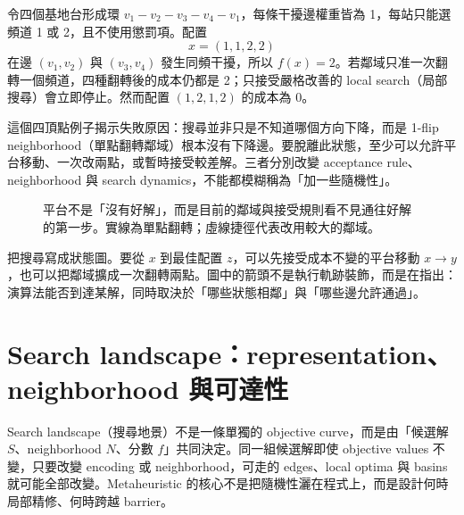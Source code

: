 \documentclass[11pt,a4paper,oneside,openany]{book}
\begin{document}
\begin{example}[最小但不平凡的頻道配置]
令四個基地台形成環 $v_1-v_2-v_3-v_4-v_1$，每條干擾邊權重皆為 1，每站只能選頻道 1 或 2，且不使用懲罰項。配置
\[
 x=(1,1,2,2)
\]
在邊 $(v_1,v_2)$ 與 $(v_3,v_4)$ 發生同頻干擾，所以 $f(x)=2$。若鄰域只准一次翻轉一個頻道，四種翻轉後的成本仍都是 2；只接受嚴格改善的 local search（局部搜尋）會立即停止。然而配置 $(1,2,1,2)$ 的成本為 0。

這個四頂點例子揭示失敗原因：搜尋並非只是不知道哪個方向下降，而是 1-flip neighborhood（單點翻轉鄰域）根本沒有下降邊。要脫離此狀態，至少可以允許平台移動、一次改兩點，或暫時接受較差解。三者分別改變 acceptance rule、neighborhood 與 search dynamics，不能都模糊稱為「加一些隨機性」。
\end{example}

\begin{figure}[htbp]
\centering
{}
\caption{平台不是「沒有好解」，而是目前的鄰域與接受規則看不見通往好解的第一步。實線為單點翻轉；虛線捷徑代表改用較大的鄰域。}
\label{fig:plateau-state}
\end{figure}

 把搜尋寫成狀態圖。要從 $x$ 到最佳配置 $z$，可以先接受成本不變的平台移動 $x\to y$，也可以把鄰域擴成一次翻轉兩點。圖中的箭頭不是執行軌跡裝飾，而是在指出：演算法能否到達某解，同時取決於「哪些狀態相鄰」與「哪些邊允許通過」。

\section[Search landscape：representation 與 neighborhood 如何改變可達性]
  {Search landscape：representation、neighborhood 與可達性}
\begin{coreintuition}
Search landscape（搜尋地景）不是一條單獨的 objective curve，而是由「候選解 $S$、neighborhood $N$、分數 $f$」共同決定。同一組候選解即使 objective values 不變，只要改變 encoding 或 neighborhood，可走的 edges、local optima 與 basins 就可能全部改變。Metaheuristic 的核心不是把隨機性灑在程式上，而是設計何時局部精修、何時跨越 barrier。
\end{coreintuition}
\end{document}
